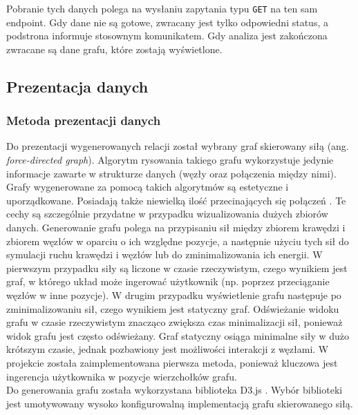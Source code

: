 \documentclass[12pt,a4paper]{article} %
\begin{document}
            Pobranie tych danych polega na wysłaniu zapytania typu \texttt{GET} na ten sam endpoint. Gdy dane nie są gotowe, zwracany jest tylko odpowiedni status, a podstrona informuje stosownym komunikatem. Gdy analiza jest zakończona zwracane są dane grafu, które zostają wyświetlone.
            
    \subsection{Prezentacja danych}

        \subsubsection{Metoda prezentacji danych}
            Do prezentacji wygenerowanych relacji został wybrany graf skierowany siłą (ang. \textit{force-directed graph}).
            Algorytm rysowania takiego grafu wykorzystuje jedynie informacje zawarte w strukturze danych (węzły oraz połączenia między nimi).
            Grafy wygenerowane za pomocą takich algorytmów są estetyczne i uporządkowane. Posiadają także niewielką ilość przecinających się połączeń \cite{yeet}. Te cechy są szczególnie przydatne w przypadku wizualizowania dużych zbiorów danych. Generowanie grafu polega na przypisaniu sił między zbiorem krawędzi i zbiorem węzłów w oparciu o ich względne pozycje, a następnie użyciu tych sił do symulacji ruchu krawędzi i węzłów lub do zminimalizowania ich energii\cite{yworks}. W pierwszym przypadku siły są liczone w czasie rzeczywistym, czego wynikiem jest graf, w którego układ może ingerować użytkownik (np. poprzez przeciąganie węzłów w inne pozycje). W drugim przypadku wyświetlenie grafu następuje po zminimalizowaniu sił, czego wynikiem jest statyczny graf. Odświeżanie widoku grafu w czasie rzeczywistym znacząco zwiększa czas minimalizacji sił, ponieważ widok grafu jest często odświeżany. Graf statyczny osiąga minimalne siły w dużo krótszym czasie, jednak pozbawiony jest możliwości interakcji z węzłami. W projekcie została zaimplementowana pierwsza metoda, ponieważ kluczowa jest ingerencja użytkownika w pozycje wierzchołków grafu.\\
            
            Do generowania grafu została wykorzystana biblioteka D3.js \cite{d3}. Wybór biblioteki jest umotywowany wysoko konfigurowalną implementacją grafu skierowanego siłą.
    
\end{document}

